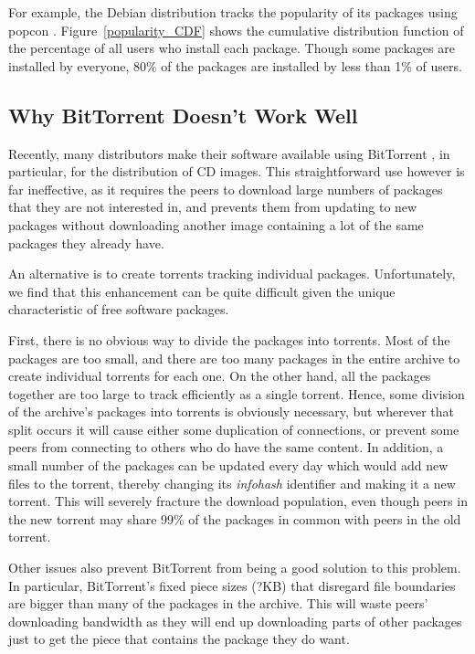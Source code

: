 \documentclass[conference]{IEEEtran}
\begin{document}
For example, the Debian distribution tracks the popularity of its
packages using popcon \cite{popcon}. Figure~\ref{popularity_CDF}
shows the cumulative distribution function of the percentage of all
users who install each package. Though some packages are installed
by everyone, 80\% of the packages are installed by less than 1\% of
users.



\subsection{Why BitTorrent Doesn't Work Well}
\label{related}

Recently, many distributors make their software available using
BitTorrent \cite{COHEN03}, in particular, for the distribution of CD
images. This straightforward use however is far ineffective, as it requires the
peers to download large numbers of packages that they are not
interested in, and prevents them from updating to new packages
without downloading another image containing a lot of the same
packages they already have. 

An alternative is to create torrents tracking individual packages. Unfortunately, we find that this enhancement can be
quite difficult given the unique characteristic of free software packages. 

First, there is no obvious way to divide the packages into torrents.
Most of the packages are too small, and there are too many packages
in the entire archive to create individual torrents for each one.
On the other hand, all the packages together are too large to track
efficiently as a single torrent. Hence, some division of the archive's
packages into torrents is obviously necessary, but wherever that
split occurs it will cause either some duplication of connections,
or prevent some peers from connecting to others who do have the same
content. In addition, a small number of the packages can be updated every
day which would add new files to the torrent, thereby changing its
\emph{infohash} identifier and making it a new torrent. This will
severely fracture the download population, even though peers in the
new torrent may share 99\% of the packages in common with peers in the
old torrent.

Other issues also prevent BitTorrent from being a good solution to
this problem. In particular, BitTorrent's fixed piece sizes (?KB) that disregard file
boundaries are bigger than many of the packages in the archive. This
will waste peers' downloading bandwidth as they will end up
downloading parts of other packages just to get the piece that
contains the package they do want. 
\end{document}
